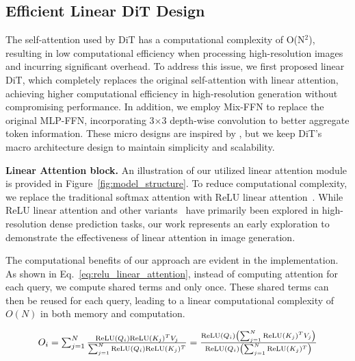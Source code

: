 


\subsection{Efficient Linear DiT Design} \label{sec:efficient_design}

The self-attention used by DiT has a computational complexity of O(N$^2$), resulting in low computational efficiency when processing high-resolution images and incurring significant overhead. To address this issue, we first proposed linear DiT, which completely replaces the original self-attention with linear attention, achieving higher computational efficiency in high-resolution generation without compromising performance. In addition, we employ Mix-FFN to replace the original MLP-FFN, incorporating 3$\times$3 depth-wise convolution to better aggregate token information. These micro designs are inspired by \cite{cai2023efficientvit,xie2021segformer}, but we keep DiT's macro architecture design to maintain simplicity and scalability.



\noindent \textbf{Linear Attention block.}
An illustration of our utilized linear attention module is provided in Figure~\ref{fig:model_structure}. 
To reduce computational complexity, we replace the traditional softmax attention with ReLU linear attention~\citep{katharopoulos2020transformers}. 
While ReLU linear attention and other variants~\citep{cai2023efficientvit,wang2020linformer,shen2021efficient,bolya2022hydra} have primarily been explored in high-resolution dense prediction tasks, 
our work represents an early exploration to demonstrate the effectiveness of linear attention in image generation. 

The computational benefits of our approach are evident in the implementation. As shown in Eq.~\ref{eq:relu_linear_attention}, instead of computing attention for each query, we compute shared terms  and  only once. These shared terms can then be reused for each query, leading to a linear computational complexity of $O(N)$ in both memory and computation.

\begin{equation}
  \vspace{-0.5em}
  \scalebox{1}{
    $O_i = \sum_{j=1}^{N} \frac{\text{ReLU}(Q_i) \text{ReLU}(K_j)^T V_j}{\sum_{j=1}^{N} \text{ReLU}(Q_i) \text{ReLU}(K_j)^T} = \frac{\text{ReLU}(Q_i) \left( \sum_{j=1}^{N} \text{ReLU}(K_j)^T V_j \right)}{\text{ReLU}(Q_i) \left( \sum_{j=1}^{N} \text{ReLU}(K_j)^T \right)}$
  }
  \label{eq:relu_linear_attention}
  \vspace{-0.5em}
\end{equation}

